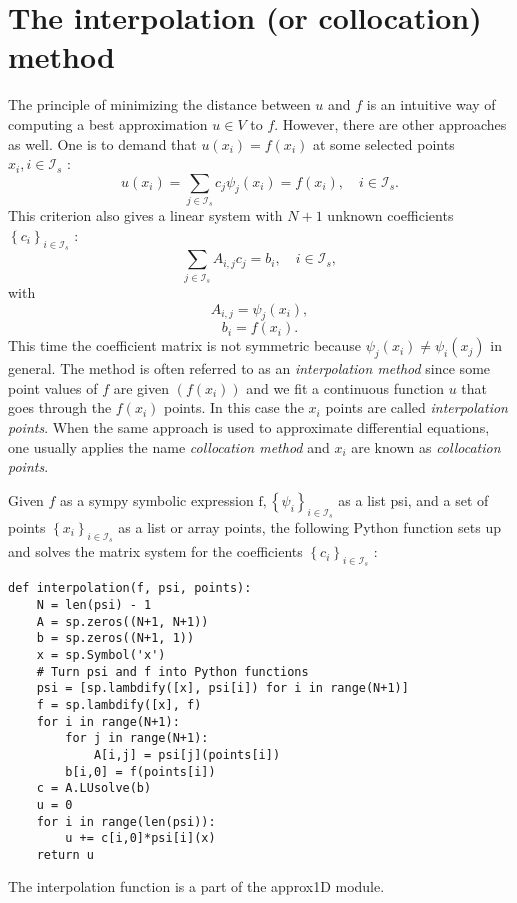 \documentclass[../main.tex]{subfiles}
\begin{document}
\section[The interpolation (or collocation) method]{The interpolation (or collocation) method}
\label{sec:sec_2_10}
The principle of minimizing the distance between $u$ and $f$ is an intuitive way of computing a best approximation $u \in V$ to $f$. However, there are other approaches as well. One is to demand that $u\left(x_{i}\right)=f\left(x_{i}\right)$ at some selected points $x_{i}, i \in \mathcal{I}_{s}$ :
\begin{equation}\label{eqa42}
	u\left(x_{i}\right)=\sum_{j \in \mathcal{I}_{s}} c_{j} \psi_{j}\left(x_{i}\right)=f\left(x_{i}\right), \quad i \in \mathcal{I}_{s}.
\end{equation}
This criterion also gives a linear system with $N+1$ unknown coefficients
$\left\{c_{i}\right\}_{i \in \mathcal{I}_{s}}$ :
\begin{equation}\label{eqa43}
	\sum_{j \in \mathcal{I}_{s}} A_{i, j} c_{j}=b_{i}, \quad i \in \mathcal{I}_{s},
\end{equation}
with
\begin{equation}\label{eqa44}
	A_{i, j} = \psi_{j}\left(x_{i}\right),
\end{equation}
\begin{equation}\label{eqa45}
	b_{i} = f\left(x_{i}\right).
\end{equation}
This time the coefficient matrix is not symmetric because $\psi_{j}\left(x_{i}\right) \neq \psi_{i}\left(x_{j}\right)$ in general. The method is often referred to as an \textit{interpolation method} since some point values of $f$ are given $\left(f\left(x_{i}\right)\right)$ and we fit a continuous function $u$ that goes through the $f\left(x_{i}\right)$ points. In this case the $x_{i}$ points are called \textit{interpolation points}. When the same approach is used to approximate differential equations, one usually applies the name \textit{collocation method} and $x_{i}$ are known as \textit{collocation points}.

Given $f$ as a sympy symbolic expression $\mathrm{f},\left\{\psi_{i}\right\}_{i \in \mathcal{I}_{s}}$ as a list psi, and a set of points $\left\{x_{i}\right\}_{i \in \mathcal{I}_{s}}$ as a list or array points, the following Python function sets up and solves the matrix system for the coefficients $\left\{c_{i}\right\}_{i \in \mathcal{I}_{s}}$ :
\begin{lstlisting}[numbers=none]
def interpolation(f, psi, points):
	N = len(psi) - 1
	A = sp.zeros((N+1, N+1))
	b = sp.zeros((N+1, 1))
	x = sp.Symbol('x')
	# Turn psi and f into Python functions
	psi = [sp.lambdify([x], psi[i]) for i in range(N+1)]
	f = sp.lambdify([x], f)
	for i in range(N+1):
		for j in range(N+1):
			A[i,j] = psi[j](points[i])
		b[i,0] = f(points[i])
	c = A.LUsolve(b)
	u = 0
	for i in range(len(psi)):
		u += c[i,0]*psi[i](x)
	return u	
\end{lstlisting}	
The interpolation function is a part of the approx1D module.
\end{document}
